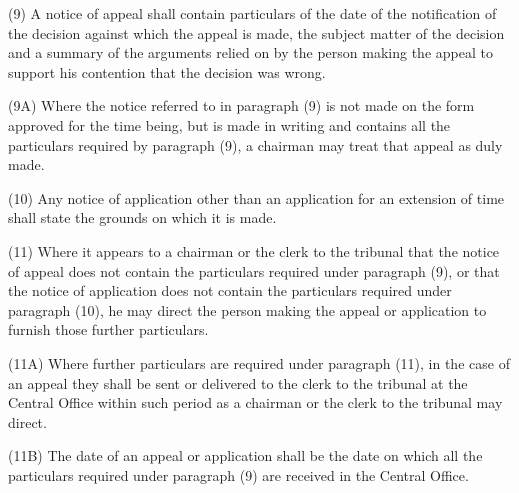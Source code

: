 \documentclass[a4paper]{article}
\begin{document}

(9) A notice of appeal shall contain particulars of the date of the notification of the decision against which the appeal is made, the subject matter of the decision and a summary of the arguments relied on by the person making the appeal to support his contention that the decision was wrong.

(9A) Where the notice referred to in paragraph (9) is not made on the form approved for the time being, but is made in writing and contains all the particulars required by paragraph (9), a chairman may treat that appeal as duly made.

(10) Any notice of 
application other than an application for an extension of time shall state the grounds on which it is made.


(11) Where it appears to a chairman or the clerk to the tribunal that the notice of appeal does not contain the particulars required under paragraph (9), or that the notice of application does not contain the particulars required under paragraph (10), he may direct the person making the appeal or application to furnish those further particulars.

(11A) Where further particulars are required under paragraph (11), in the case of an appeal they shall be sent or delivered to the clerk to the tribunal at the Central Office within such period as a chairman or the clerk to the tribunal may direct.

(11B) The date of an appeal or application shall be the date on which all the particulars required under paragraph (9) are received in the Central Office.
\end{document}
